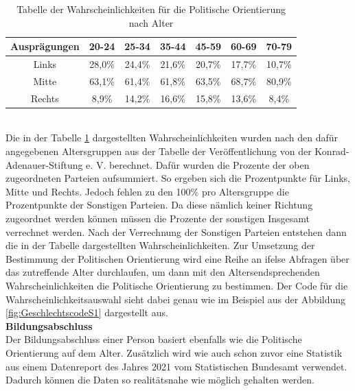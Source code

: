 \begin{onehalfspace}
\begin{table}[!h]
    \centering
    \begin{tabular}{|c|c|c|c|c|c|c|}
    \hline
    \textbf{Ausprägungen} & \textbf{20-24} & \textbf{25-34} & \textbf{35-44} & \textbf{45-59} & \textbf{60-69} & \textbf{70-79} \\ \hline
    Links                 & 28,0\%         & 24,4\%         & 21,6\%         & 20,7\%         & 17,7\%         & 10,7\%         \\ \hline
    Mitte                 & 63,1\%         & 61,4\%         & 61,8\%         & 63,5\%         & 68,7\%         & 80,9\%         \\ \hline
    Rechts                & 8,9\%          & 14,2\%         & 16,6\%         & 15,8\%         & 13,6\%         & 8,4\%          \\ \hline
    \end{tabular}
    \caption{Tabelle der Wahrscheinlichkeiten für die Politische Orientierung nach Alter}
    \label{table:7}
\end{table}\\
Die in der Tabelle \ref{table:7} dargestellten Wahrscheinlichkeiten wurden nach den dafür angegebenen Altersgruppen aus der Tabelle der Veröffentlichung von der Konrad-Adenauer-Stiftung e. V. berechnet. Dafür wurden die Prozente der oben zugeordneten Parteien aufsummiert. So ergeben sich die Prozentpunkte für Links, Mitte und Rechts. Jedoch fehlen zu den 100\% pro Altersgruppe die Prozentpunkte der Sonstigen Parteien. Da diese nämlich keiner Richtung zugeordnet werden können müssen die Prozente der sonstigen Insgesamt verrechnet werden. Nach der Verrechnung der Sonstigen Parteien entstehen dann die in der Tabelle dargestellten Wahrscheinlichkeiten.\cite[S. 33]{konrad-adenauer-stiftung2021} Zur Umsetzung der Bestimmung der Politischen Orientierung wird eine Reihe an ifelse Abfragen über das zutreffende Alter durchlaufen, um dann mit den Altersendsprechenden Wahrscheinlichkeiten die Politische Orientierung zu bestimmen. Der Code für die Wahrscheinlichkeitsauswahl sieht dabei genau wie im Beispiel aus der Abbildung \ref{fig:GeschlechtscodeS1} dargestellt aus.\\
\textbf{Bildungsabschluss}\\
Der Bildungsabschluss einer Person basiert ebenfalls wie die Politische Orientierung auf dem Alter. Zusätzlich wird wie auch schon zuvor eine Statistik aus einem Datenreport des Jahres 2021 vom Statistischen Bundesamt verwendet. \cite{destatis2021} Dadurch können die Daten so realitätsnahe wie möglich gehalten werden.\\ 

\end{onehalfspace}
